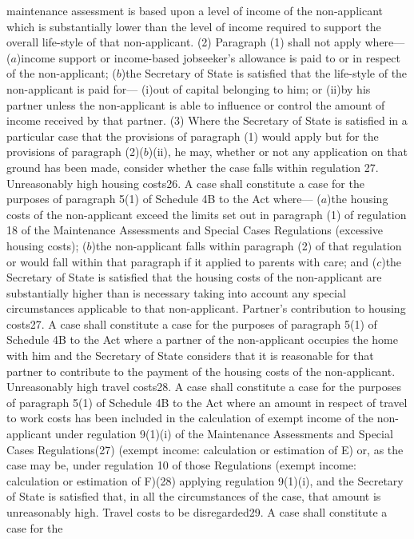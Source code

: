 \documentclass[a4paper]{article}
\begin{document}
maintenance assessment is based upon a level of income of the non-applicant
which is substantially lower than the level of income required to support the
overall life-style of that non-applicant.
(2) Paragraph (1) shall not apply where—
($a$)income support or income-based jobseeker’s allowance is paid to or in respect
of the non-applicant;
($b$)the Secretary of State is satisfied that the life-style of the non-applicant
is paid for—
(i)out of capital belonging to him; or
(ii)by his partner unless the non-applicant is able to influence or control the
amount of income received by that partner.
(3) Where the Secretary of State is satisfied in a particular case that the
provisions of paragraph (1) would apply but for the provisions of paragraph
(2)($b$)(ii), he may, whether or not any application on that ground has been made,
consider whether the case falls within regulation 27.
Unreasonably high housing costs26. A case shall constitute a case for the
purposes of paragraph 5(1) of Schedule 4B to the Act where—
($a$)the housing costs of the non-applicant exceed the limits set out in paragraph
(1) of regulation 18 of the Maintenance Assessments and Special Cases
Regulations (excessive housing costs);
($b$)the non-applicant falls within paragraph (2) of that regulation or would fall
within that paragraph if it applied to parents with care; and
($c$)the Secretary of State is satisfied that the housing costs of the
non-applicant are substantially higher than is necessary taking into account any
special circumstances applicable to that non-applicant.
Partner’s contribution to housing costs27. A case shall constitute a case for
the purposes of paragraph 5(1) of Schedule 4B to the Act where a partner of the
non-applicant occupies the home with him and the Secretary of State considers
that it is reasonable for that partner to contribute to the payment of the
housing costs of the non-applicant.
Unreasonably high travel costs28. A case shall constitute a case for the
purposes of paragraph 5(1) of Schedule 4B to the Act where an amount in respect
of travel to work costs has been included in the calculation of exempt income of
the non-applicant under regulation 9(1)(i) of the Maintenance Assessments and
Special Cases Regulations(27) (exempt income: calculation or estimation of E)
or, as the case may be, under regulation 10 of those Regulations (exempt income:
calculation or estimation of F)(28) applying regulation 9(1)(i), and the
Secretary of State is satisfied that, in all the circumstances of the case, that
amount is unreasonably high.
Travel costs to be disregarded29. A case shall constitute a case for the
\end{document}
